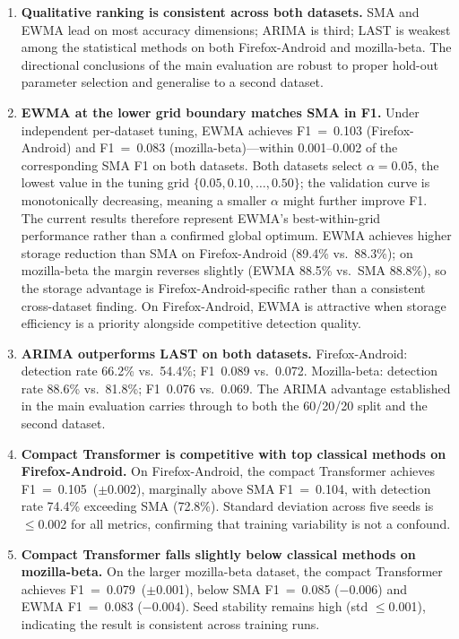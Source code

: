 \documentclass[pdflatex,sn-nature]{sn-jnl}
\theoremstyle{thmstyleone}%
\begin{document}
\begin{enumerate}
  \item \textbf{Qualitative ranking is consistent across both datasets.}
    SMA and EWMA lead on most accuracy dimensions; ARIMA is third; LAST
    is weakest among the statistical methods on both Firefox-Android and
    mozilla-beta.
    The directional conclusions of the main evaluation are robust to proper
    hold-out parameter selection and generalise to a second dataset.

  \item \textbf{EWMA at the lower grid boundary matches SMA in F1.}
    Under independent per-dataset tuning, EWMA achieves F1~=~0.103
    (Firefox-Android) and F1~=~0.083 (mozilla-beta)---within 0.001--0.002
    of the corresponding SMA F1 on both datasets.
    Both datasets select $\alpha=0.05$, the lowest value in the tuning grid
    $\{0.05, 0.10, \ldots, 0.50\}$; the validation curve is monotonically
    decreasing, meaning a smaller $\alpha$ might further improve F1.
    The current results therefore represent EWMA's best-within-grid
    performance rather than a confirmed global optimum.
    EWMA achieves higher storage reduction than SMA on Firefox-Android
    (89.4\% vs.\ 88.3\%); on mozilla-beta the margin reverses slightly
    (EWMA 88.5\% vs.\ SMA 88.8\%), so the storage advantage is
    Firefox-Android-specific rather than a consistent cross-dataset finding.
    On Firefox-Android, EWMA is attractive when storage efficiency is a
    priority alongside competitive detection quality.

  \item \textbf{ARIMA outperforms LAST on both datasets.}
    Firefox-Android: detection rate 66.2\% vs.\ 54.4\%; F1~0.089 vs.\ 0.072.
    Mozilla-beta: detection rate 88.6\% vs.\ 81.8\%; F1~0.076 vs.\ 0.069.
    The ARIMA advantage established in the main evaluation carries through
    to both the 60/20/20 split and the second dataset.

  \item \textbf{Compact Transformer is competitive with top classical methods
    on Firefox-Android.}
    On Firefox-Android, the compact Transformer achieves
    F1~=~0.105~($\pm$0.002), marginally above SMA F1~=~0.104, with
    detection rate 74.4\% exceeding SMA (72.8\%).
    Standard deviation across five seeds is $\leq$0.002 for all metrics,
    confirming that training variability is not a confound.

  \item \textbf{Compact Transformer falls slightly below classical methods
    on mozilla-beta.}
    On the larger mozilla-beta dataset, the compact Transformer achieves
    F1~=~0.079~($\pm$0.001), below SMA F1~=~0.085 ($-$0.006) and
    EWMA F1~=~0.083 ($-$0.004).
    Seed stability remains high (std $\leq$0.001), indicating the result
    is consistent across training runs.


\end{enumerate}
\end{document}
